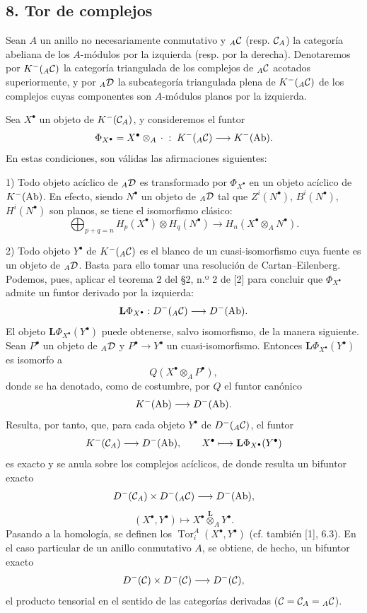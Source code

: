 \subsection*{8. Tor de complejos}

Sean $A$ un anillo no necesariamente conmutativo y ${}_A\mathcal C$ (resp. $\mathcal C_A$) la categoría abeliana de los $A$-módulos por la izquierda (resp. por la derecha). Denotaremos por $K^-({}_A\mathcal C)$ la categoría triangulada de los complejos de ${}_A\mathcal C$ acotados superiormente, y por ${}_A\mathcal D$ la subcategoría triangulada plena de $K^-({}_A\mathcal C)$ de los complejos cuyas componentes son $A$-módulos planos por la izquierda.

Sea $X^\bullet$ un objeto de $K^-(\mathcal C_A)$, y consideremos el funtor
\[
\Phi_{X^\bullet}=X^\bullet\otimes_A\,\cdot\;:\;K^-({}_A\mathcal C)\longrightarrow K^-(\operatorname{Ab}).
\]
En estas condiciones, son válidas las afirmaciones siguientes:

1) Todo objeto acíclico de ${}_A\mathcal D$ es transformado por $\Phi_{X^\bullet}$ en un objeto acíclico de $K^-(\operatorname{Ab})$. En efecto, siendo $N^\bullet$ un objeto de ${}_A\mathcal D$ tal que $Z^i(N^\bullet)$, $B^i(N^\bullet)$, $H^i(N^\bullet)$ son planos, se tiene el isomorfismo clásico:
\[
\bigoplus_{p+q=n}H_p(X^\bullet)\otimes H_q(N^\bullet)
\longrightarrow H_n(X^\bullet\otimes_A N^\bullet).
\]

2) Todo objeto $Y^\bullet$ de $K^-({}_A\mathcal C)$ es el blanco de un cuasi-isomorfismo cuya fuente es un objeto de ${}_A\mathcal D$. Basta para ello tomar una resolución de Cartan--Eilenberg. Podemos, pues, aplicar el teorema 2 del §2, n.º 2 de [2] para concluir que $\Phi_{X^\bullet}$ admite un funtor derivado por la izquierda:
\[
\mathbf L\Phi_{X^\bullet}:D^-({}_A\mathcal C)\longrightarrow D^-(\operatorname{Ab}).
\]
El objeto $\mathbf L\Phi_{X^\bullet}(Y^\bullet)$ puede obtenerse, salvo isomorfismo, de la manera siguiente. Sean $P^\bullet$ un objeto de ${}_A\mathcal D$ y $P^\bullet\to Y^\bullet$ un cuasi-isomorfismo. Entonces $\mathbf L\Phi_{X^\bullet}(Y^\bullet)$ es isomorfo a
\[
Q(X^\bullet\otimes_A P^\bullet),
\]
donde se ha denotado, como de costumbre, por $Q$ el funtor canónico
\[
K^-(\operatorname{Ab})\longrightarrow D^-(\operatorname{Ab}).
\]
Resulta, por tanto, que, para cada objeto $Y^\bullet$ de $D^-({}_A\mathcal C)$, el funtor
\[
K^-(\mathcal C_A)\longrightarrow D^-(\operatorname{Ab}),\qquad
X^\bullet\longmapsto \mathbf L\Phi_{X^\bullet}(Y^\bullet)
\]
es exacto y se anula sobre los complejos acíclicos, de donde resulta un bifuntor exacto
\[
D^-(\mathcal C_A)\times D^-({}_A\mathcal C)\longrightarrow D^-(\operatorname{Ab}),
\]
\[
(X^\bullet,Y^\bullet)\longmapsto X^\bullet\overset{\mathbf L}{\otimes}_A Y^\bullet.
\]
Pasando a la homología, se definen los $\operatorname{Tor}_i^A(X^\bullet,Y^\bullet)$ (cf. también [1], 6.3). En el caso particular de un anillo conmutativo $A$, se obtiene, de hecho, un bifuntor exacto
\[
D^-(\mathcal C)\times D^-(\mathcal C)\longrightarrow D^-(\mathcal C),
\]
el producto tensorial en el sentido de las categorías derivadas ($\mathcal C=\mathcal C_A={}_A\mathcal C$).

